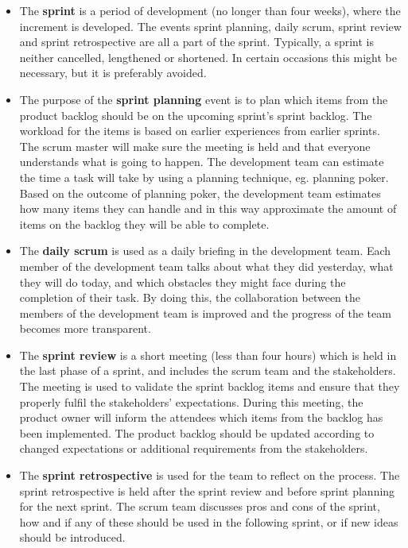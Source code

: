 \begin{itemize}
\item The \textbf{sprint} is a period of development (no longer than four weeks), where the increment is developed. The events sprint planning, daily scrum, sprint review and sprint retrospective are all a part of the sprint. Typically, a sprint is neither cancelled, lengthened or shortened. In certain occasions this might be necessary, but it is preferably avoided.

\item The purpose of the \textbf{sprint planning} event is to plan which items from the product backlog should be on the upcoming sprint's sprint backlog. The workload for the items is based on earlier experiences from earlier sprints. The scrum master will make sure the meeting is held and that everyone understands what is going to happen. The development team can estimate the time a task will take by using a planning technique, eg. planning poker. 
Based on the outcome of planning poker, the development team estimates how many items they can handle and in this way approximate the amount of items on the backlog they will be able to complete.

\item The \textbf{daily scrum} is used as a daily briefing in the development team. Each member of the development team talks about what they did yesterday, what they will do today, and which obstacles they might face during the completion of their task. By doing this, the collaboration between the members of the development team is improved and the progress of the team becomes more transparent.

\item The \textbf{sprint review} is a short meeting (less than four hours) which is held in the last phase of a sprint, and includes the scrum team and the stakeholders. 
The meeting is used to validate the sprint backlog items and ensure that they properly fulfil the stakeholders' expectations. During this meeting, the product owner will inform the attendees which items from the backlog has been implemented.
The product backlog should be updated according to changed expectations or additional requirements from the stakeholders.

\item The \textbf{sprint retrospective} is used for the team to reflect on the process. The sprint retrospective is held after the sprint review and before sprint planning for the next sprint. 
The scrum team discusses pros and cons of the sprint, how and if any of these should be used in the following sprint, or if new ideas should be introduced.
\end{itemize}


